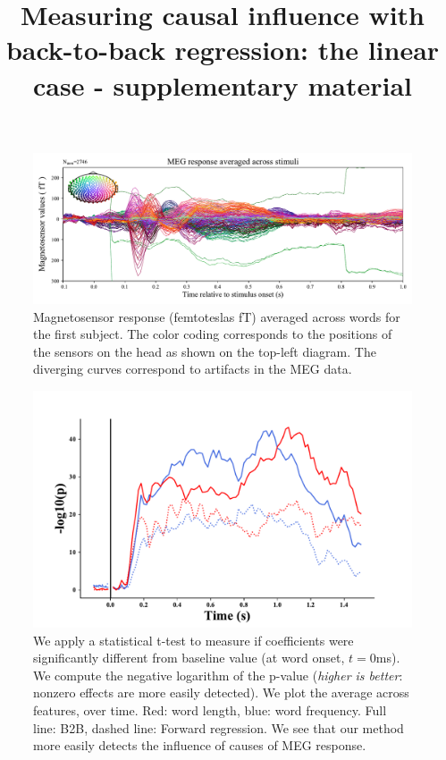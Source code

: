 \documentclass{article}
\title{Measuring causal influence with\\ back-to-back regression: the linear case - supplementary material}
\begin{document}
\maketitle

\begin{figure}[h]
  \centering
  \includegraphics[width=\textwidth, trim=0cm 0cm 0cm 0cm, clip=True]{figures/meg_sensors.pdf}
  \caption{Magnetosensor response (femtoteslas fT) averaged across words for the first subject. The color coding corresponds to the positions of the sensors on the head as shown on the top-left diagram. The diverging curves correspond to artifacts in the MEG data.}
  \label{fig:megavg}
\end{figure}


\begin{figure}[h]
  \centering
  \includegraphics[width=\textwidth, trim=0cm 0cm 0cm 0cm]{figures/pvalues.pdf}
  \caption{We apply a statistical t-test to measure if coefficients were significantly different from baseline value (at word onset, $t=0$ms).
  We compute the negative logarithm of the p-value (\textit{higher is better}: nonzero effects are more easily detected). We plot the average across features, over time. Red: word length, blue: word frequency.
  Full line: B2B, dashed line: Forward regression. We see that our method more easily detects the influence of causes of MEG response.}
\end{figure}
\end{document}
